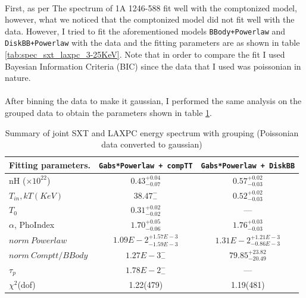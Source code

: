 \documentclass[a4paper,twoside]{report}
\numberwithin{equation}{section}
\begin{document}
\paragraph{}
First, as per \cite{t'Zand} The spectrum of 1A 1246-588 fit well with the comptonized model, however, what we noticed that the comptonized model did not fit well with the data. However, I tried to fit the aforementioned models \texttt{BBody+Powerlaw} and \texttt{DiskBB+Powerlaw} with the data and the fitting parameters are as shown in table \ref{tab:spec_sxt_laxpc_3-25KeV}. Note that in order to compare the fit I used Bayesian Information Criteria (BIC) \cite{BIC1} since the data that I used was poissonian in nature. 
\paragraph{}
After binning the data to make it gaussian, I performed the same analysis on the grouped data to obtain the parameters shown in table \ref{tab:spec_sxt_laxpc_3-25KeV_2}.
\begin{table}
\begin{small}
\caption{Summary of joint SXT and LAXPC energy spectrum with grouping (Poissonian data converted to gaussian)}
\label{tab:spec_sxt_laxpc_3-25KeV_2}
\begin{center}
\begin{tabular}{p{3cm}cc}
\hline \hline
Fitting parameters.                             & \texttt{Gabs*Powerlaw + compTT}   & \texttt{Gabs*Powerlaw + DiskBB} \\ \hline \hline
nH ($\times 10^{22}$)                           & $0.43_{-0.07}^{+0.04}$            &$0.57_{-0.03}^{+0.02}$         \\
$T_{in}, kT (KeV)$                              & $38.47_{-}^{-}$                 &$0.52_{-0.03}^{+0.02}$         \\
$T_0$                                           & $0.31_{-0.02}^{+0.02}$            & ---                         \\
$\alpha$, PhoIndex                              & $1.70_{-0.06}^{+0.05}$            &$1.76_{-0.03}^{+0.03}$         \\\hline
$norm \ Powerlaw$                                 & $1.09E-2_{-1.59E-3}^{+1.57E-3}$   &$1.31E-2_{-0.86E-3}^{+1.21E-3}$\\ \hline
$norm \ Comptt/BBody$                             & $1.27E-3_{-}^{-}$               &$79.85_{-20.49}^{+23.82}$   \\ \hline
$\tau_p$                                        & $1.78E-2_{-}^{-}$               & ---   \\
\hline \hline
$\chi^2$(dof)                                   &  1.22(479)                        & 1.19(481)               \\
\hline \hline
\end{tabular}
\end{center}
\end{small}
\end{table}
\end{document}
